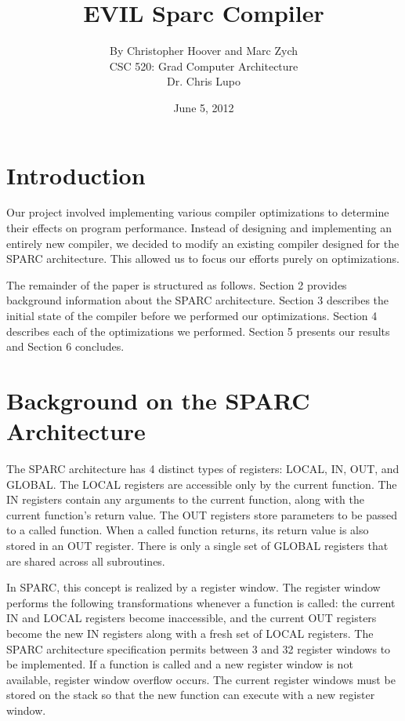\documentclass[12pt]{article}
\begin{document}
\title{EVIL Sparc Compiler}

\author{
By Christopher Hoover and Marc Zych \vspace{10pt} \\
CSC 520: Grad Computer Architecture \vspace{10pt} \\
Dr. Chris Lupo \vspace{10pt} \\
}
\date{June 5, 2012}

\maketitle

\vfill

\thispagestyle{empty}
\newpage

\tableofcontents
\newpage

\section{Introduction}
Our project involved implementing various compiler optimizations to determine their effects on program performance.
Instead of designing and implementing an entirely new compiler, we decided to modify an existing compiler designed for the SPARC architecture.
This allowed us to focus our efforts purely on optimizations.

The remainder of the paper is structured as follows.
Section 2 provides background information about the SPARC architecture.
Section 3 describes the initial state of the compiler before we performed our optimizations.
Section 4 describes each of the optimizations we performed.
Section 5 presents our results and Section 6 concludes.

\section{Background on the SPARC Architecture}
The SPARC architecture has 4 distinct types of registers: LOCAL, IN, OUT, and GLOBAL.
The LOCAL registers are accessible only by the current function.
The IN registers contain any arguments to the current function, along with the current function's return value.
The OUT registers store parameters to be passed to a called function.
When a called function returns, its return value is also stored in an OUT register.
There is only a single set of GLOBAL registers that are shared across all subroutines.

In SPARC, this concept is realized by a register window.
The register window performs the following transformations whenever a function is called: the current IN and LOCAL registers become inaccessible, and the current OUT registers become the new IN registers along with a fresh set of LOCAL registers.
The SPARC architecture specification permits between 3 and 32 register windows to be implemented.
If a function is called and a new register window is not available, register window overflow occurs.
The current register windows must be stored on the stack so that the new function can execute with a new register window.
\end{document}
